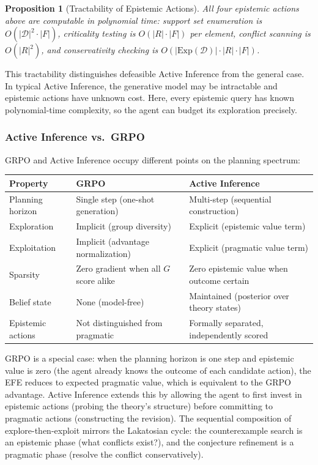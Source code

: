 \documentclass{article}
\newtheorem{proposition}[theorem]{Proposition}
\theoremstyle{definition}
\newcommand{\D}{\mathcal{D}}
\newcommand{\Exp}{\mathrm{Exp}}
\begin{document}
\begin{proposition}[Tractability of Epistemic Actions]\label{prop:epistemic_tractable}
All four epistemic actions above are computable in polynomial time: support set enumeration is $O(|\D|^2 \cdot |F|)$, criticality testing is $O(|R| \cdot |F|)$ per element, conflict scanning is $O(|R|^2)$, and conservativity checking is $O(|\Exp(\D)| \cdot |R| \cdot |F|)$.
\end{proposition}

This tractability distinguishes defeasible Active Inference from the general case. In typical Active Inference, the generative model may be intractable and epistemic actions have unknown cost. Here, every epistemic query has known polynomial-time complexity, so the agent can budget its exploration precisely.

\subsubsection{Active Inference vs.\ GRPO}

GRPO and Active Inference occupy different points on the planning spectrum:

\begin{center}
\small
\begin{tabular}{@{}lll@{}}
\toprule
Property & GRPO & Active Inference \\
\midrule
Planning horizon & Single step (one-shot generation) & Multi-step (sequential construction) \\
Exploration & Implicit (group diversity) & Explicit (epistemic value term) \\
Exploitation & Implicit (advantage normalization) & Explicit (pragmatic value term) \\
Sparsity & Zero gradient when all $G$ score alike & Zero epistemic value when outcome certain \\
Belief state & None (model-free) & Maintained (posterior over theory states) \\
Epistemic actions & Not distinguished from pragmatic & Formally separated, independently scored \\
\bottomrule
\end{tabular}
\end{center}

GRPO is a special case: when the planning horizon is one step and epistemic value is zero (the agent already knows the outcome of each candidate action), the EFE reduces to expected pragmatic value, which is equivalent to the GRPO advantage. Active Inference extends this by allowing the agent to first invest in epistemic actions (probing the theory's structure) before committing to pragmatic actions (constructing the revision). The sequential composition of explore-then-exploit mirrors the Lakatosian cycle: the counterexample search is an epistemic phase (what conflicts exist?), and the conjecture refinement is a pragmatic phase (resolve the conflict conservatively).
\end{document}
